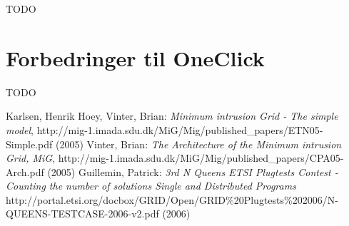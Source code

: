 \documentclass[a4,10pt]{article}
\begin{document}
%
TODO
\section{Forbedringer til OneClick}
%
TODO


\begin{thebibliography}{99}
 Karlsen, Henrik Hoey, Vinter, Brian:
\emph{Minimum intrusion Grid - The simple model},
http://mig-1.imada.sdu.dk/MiG/Mig/published\_papers/ETN05-Simple.pdf (2005)
 Vinter, Brian:
\emph{The Architecture of the Minimum intrusion Grid, MiG},
http://mig-1.imada.sdu.dk/MiG/Mig/published\_papers/CPA05-Arch.pdf
(2005)
 Guillemin, Patrick:
\emph{3rd N Queens ETSI Plugtests Contest - Counting the number of
  solutions Single and Distributed Programs}
http://portal.etsi.org/docbox/GRID/Open/GRID\%20Plugtests\%202006/N-QUEENS-TESTCASE-2006-v2.pdf (2006)
\end{thebibliography}

%
\end{document}
